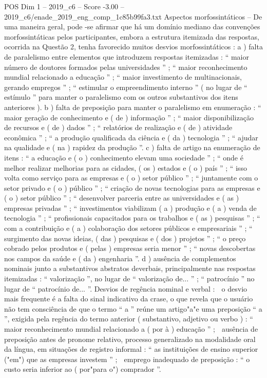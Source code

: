 \begin{textsample}{POS Dim 1 – 2019\_c6 – Score -3.00 – 2019\_c6/enade\_2019\_eng\_comp\_1c85b99fa3.txt}
Aspectos morfossintáticos – De uma maneira geral, pode -se afirmar que há um domínio mediano das convenções morfossintáticas pelos participantes, embora a estrutura itemizada das respostas, ocorrida na Questão 2, tenha favorecido muitos desvios morfossintáticos : a ) falta de paralelismo entre elementos que introduzem respostas itemizadas : “ maior número de doutores formados pelas universidades ” ; “ maior reconhecimento mundial relacionado a educação ” ; “ maior investimento de multinacionais, gerando empregos ” ; “ estimular o empreendimento interno ” ( no lugar de “ estímulo ” para manter o paralelismo com os outros substantivos dos itens anteriores ). b ) falta de preposição para manter o paralelismo em enumeração : “ maior geração de conhecimento e ( de ) informação ” ; “ maior disponibilização de recursos e ( de ) dados ” ; “ relatórios de realização e ( de ) atividade econômica ” ; “ a produção qualificada da ciência e ( da ) tecnologia ” ; “ ajudar na qualidade e ( na ) rapidez da produção ”. c ) falta de artigo na enumeração de itens : “ a educação e ( o ) conhecimento elevam uma sociedade ” ; “ onde é melhor realizar melhorias para as cidades, ( os ) estados e ( o ) país ” ; “ isso volta como serviço para as empresas e ( o ) setor público ” ; “ juntamente com o setor privado e ( o ) público ” ; “ criação de novas tecnologias para as empresas e ( o ) setor público ” ; “ desenvolver parceria entre as universidades e ( as ) empresas privadas ” ; “ investimentos viabilizam ( a ) produção e ( a ) venda de tecnologia ” ; “ profissionais capacitados para os trabalhos e ( as ) pesquisas ” ; “ com a contribuição e ( a ) colaboração dos setores públicos e empresariais ” ; “ surgimento das novas ideias, ( das ) pesquisas e ( dos ) projetos ” ; “ o preço cobrado pelos produtos e ( pelas ) empresas seria menor ” ; “ novas descobertas nos campos da saúde e ( da ) engenharia ”. d ) ausência de complementos nominais junto a substantivos abstratos deverbais, principalmente nas respostas itemizadas : “ valorização ”, no lugar de “ valorização de... ” ; “ patrocínio ” no lugar de “ patrocínio de... ”.
Desvios de regência nominal e verbal :  o desvio mais frequente é a falta do sinal indicativo da crase, o que revela que o usuário não tem consciência de que o termo “ a ” reúne um artigo"a"e uma preposição “ a ”, exigida pela regência do termo anterior ( substantivo, adjetivo ou verbo ) : “ maior reconhecimento mundial relacionado a ( por à ) educação ” ;  ausência de preposição antes de pronome relativo, processo generalizado na modalidade oral da língua, em situações de registro informal : “ as instituições de ensino superior ("em") que as empresas investem ” ;  emprego inadequado de preposição : “ o custo seria inferior ao ( por"para o") comprador ”.

\end{textsample}
